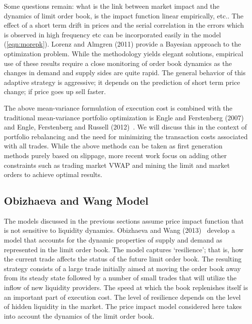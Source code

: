 Some questions remain: what is the link between market impact and the dynamics of limit order book, is the impact function linear empirically, etc.. The effect of a short term drift in prices and the serial correlation in the errors which is observed in high frequency etc can be incorporated easily in the model (\ref{eqn:morepk}). Lorenz and Almgren (2011) \cite{lovenz2011} provide a Bayesian approach to the optimization problem. While the methodology yields elegant solutions, empirical use of these results require a close monitoring of order book dynamics as the changes in demand and supply sides are quite rapid. The general behavior of this adaptive strategy is aggressive; it depends on the prediction of short term price change; if price goes up sell faster. 


The above mean-variance formulation of execution cost is combined with the traditional mean-variance portfolio optimization is Engle and Ferstenberg (2007)~\cite{engle2007} and Engle, Ferstenberg and Russell (2012)~\cite{engle2012}. We will discuss this in the context of portfolio rebalancing and the need for minimizing the transaction costs associated with all trades. While the above methods can be taken as first generation methods purely based on slippage, more recent work focus on adding other constraints such as trading market VWAP and mining the limit and market orders to achieve optimal results. 



\subsection{Obizhaeva and Wang Model}

The models discussed in the previous sections assume price impact function that is not sensitive to liquidity dynamics. Obizhaeva and Wang (2013)~\cite{obizhaeva} develop a model that accounts for the dynamic properties of supply and demand as represented in the limit order book. The model captures `resilience'; that is, how the current trade affects the status of the future limit order book. The resulting strategy consists of a large trade initially aimed at moving the order book away from its steady state followed by a number of small trades that will utilize the inflow of new liquidity providers. The speed at which the book replenishes itself is an important part of execution cost. The level of resilience depends on the level of hidden liquidity in the market. The price impact model considered here takes into account the dynamics of the limit order book.


